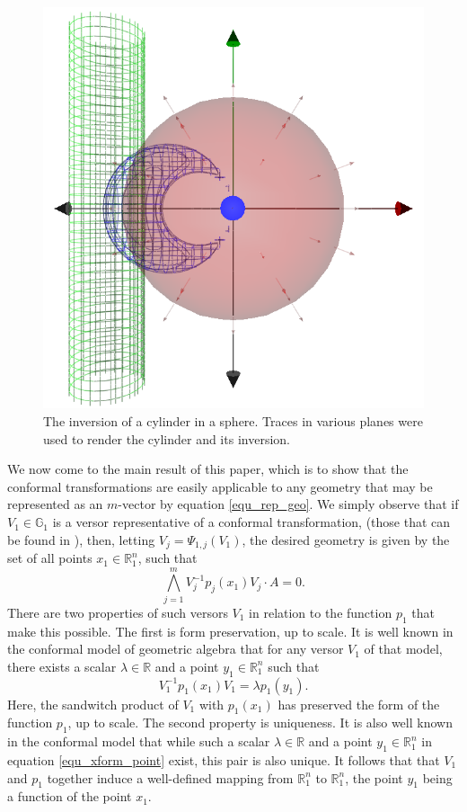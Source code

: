\documentclass{ecgd-l}
\theoremstyle{definition}
\theoremstyle{remark}
\numberwithin{equation}{section}
\newcommand{\G}{\mathbb{G}}
\newcommand{\R}{\mathbb{R}}
\begin{document}
\begin{figure}
\includegraphics[scale=0.3]{InvertCylinderInSphere}
\caption{The inversion of a cylinder in a sphere.  Traces in various planes were
used to render the cylinder and its inversion.}
\label{fig_invert_cylinder_in_sphere}
\end{figure}
We now come to the main result of this paper, which is to show
that the conformal transformations are easily applicable to any geometry
that may be represented as an $m$-vector by equation \eqref{equ_rep_geo}.
We simply observe that if $V_1\in\G_1$ is a versor representative
of a conformal transformation, (those that can be found in \cite{Dorst07,LiRockwood01}),
then, letting $V_j=\Psi_{1,j}(V_1)$, the desired
geometry is given by the set of all points $x_1\in\R^n_1$, such that
\begin{equation}\label{equ_xform_intuition}
\bigwedge_{j=1}^m V_j^{-1} p_j(x_1) V_j\cdot A=0.
\end{equation}
There are two properties of such versors $V_1$ in relation to the function $p_1$
that make this possible.  The first is form preservation, up to scale.  It is well known in the conformal
model of geometric algebra that for any versor $V_1$ of that model, there exists a scalar $\lambda\in\R$
and a point $y_1\in\R_1^n$ such that
\begin{equation}\label{equ_xform_point}
V_1^{-1}p_1(x_1)V_1 = \lambda p_1(y_1).
\end{equation}
Here, the sandwitch product of $V_1$ with $p_1(x_1)$ has preserved the form of the
function $p_1$, up to scale.  The second property is uniqueness.
It is also well known in the conformal model that while such a scalar $\lambda\in\R$ and a
point $y_1\in\R_1^n$ in equation \eqref{equ_xform_point} exist, this pair is also unique.  It follows that
that $V_1$ and $p_1$ together induce a well-defined mapping from $\R_1^n$ to $\R_1^n$,
the point $y_1$ being a function of the point $x_1$.
\end{document}
